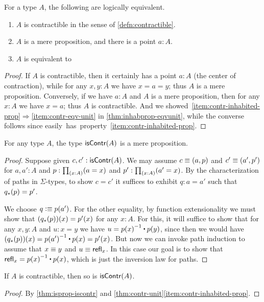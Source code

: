 \begin{lem}\label{thm:contr-unit}
  For a type $A$, the following are logically equivalent.
  \begin{enumerate}
  \item $A$ is contractible in the sense of \autoref{defn:contractible}.\label{item:contr}
  \item $A$ is a mere proposition, and there is a point $a:A$.\label{item:contr-inhabited-prop}
  \item $A$ is equivalent to \unit.\label{item:contr-eqv-unit}
  \end{enumerate}
\end{lem}
\begin{proof}
  If $A$ is contractible, then it certainly has a point $a:A$ (the center of contraction), while for any $x,y:A$ we have $x=a=y$; thus $A$ is a mere proposition.
  Conversely, if we have $a:A$ and $A$ is a mere proposition, then for any $x:A$ we have $x=a$; thus $A$ is contractible.
  And we showed~\ref{item:contr-inhabited-prop}$\Rightarrow$\ref{item:contr-eqv-unit} in \autoref{thm:inhabprop-eqvunit}, while the converse follows since \unit easily has property~\ref{item:contr-inhabited-prop}.
\end{proof}

\begin{lem}\label{thm:isprop-iscontr}
  For any type $A$, the type $\mathsf{isContr}(A)$ is a mere proposition.
\end{lem}
\begin{proof}
  Suppose given $c,c':\mathsf{isContr}(A)$.
  We may assume $c\equiv(a,p)$ and $c'\equiv(a',p')$ for $a,a':A$ and $p:\prd{x:A} (a=x)$ and $p':\prd{x:A} (a'=x)$.
  By the characterization of paths in $\Sigma$-types, to show $c=c'$ it suffices to exhibit $q:a=a'$ such that ${q}_{*}\mathopen{}\left({p}\right)\mathclose{}=p'$.

  We choose $q\vcentcolon\equiv p(a')$.
  For the other equality, by function extensionality we must show that $({q}_{*}\mathopen{}\left({p}\right)\mathclose{})(x)=p'(x)$ for any $x:A$.
  For this, it will suffice to show that for any $x,y:A$ and $u:x=y$ we have $u= \opp{p(x)} \ct p(y)$, since then we would have $(\trans q p)(x) = \opp{p(a')} \ct p(x) = p'(x)$.
  But now we can invoke path induction to assume that $x\equiv y$ and $u\equiv \mathsf{refl}_{x}$.
  In this case our goal is to show that $\refl x = \opp{p(x)} \ct p(x)$, which is just the inversion law for paths.
\end{proof}

\begin{cor}\label{thm:contr-contr}
  If $A$ is contractible, then so is $\mathsf{isContr}(A)$.
\end{cor}
\begin{proof}
  By \autoref{thm:isprop-iscontr} and \autoref{thm:contr-unit}\ref{item:contr-inhabited-prop}.
\end{proof}

